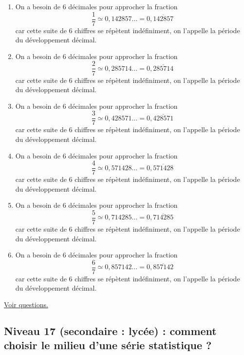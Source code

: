 \documentclass[11pt]{article}
\begin{document}
\begin{enumerate}
\item On a besoin de 6 décimales pour approcher la fraction 
     \[\dfrac{1}{7} \simeq 0,142857\dots = 0,\overline{142857}\]
     car cette suite de 6 chiffres se répètent indéfiniment, on
l'appelle la période du développement décimal.
\item On a besoin de 6 décimales pour approcher la fraction 
     \[\dfrac{2}{7} \simeq 0,285714\dots = 0,\overline{285714}\]
     car cette suite de 6 chiffres se répètent indéfiniment, on
l'appelle la période du développement décimal.
\item On a besoin de 6 décimales pour approcher la fraction 
     \[\dfrac{3}{7} \simeq 0,428571\dots = 0,\overline{428571}\]
     car cette suite de 6 chiffres se répètent indéfiniment, on
l'appelle la période du développement décimal.
\item On a besoin de 6 décimales pour approcher la fraction 
     \[\dfrac{4}{7} \simeq 0,571428\dots = 0,\overline{571428}\]
     car cette suite de 6 chiffres se répètent indéfiniment, on
l'appelle la période du développement décimal.
\item On a besoin de 6 décimales pour approcher la fraction 
     \[\dfrac{5}{7} \simeq 0,714285\dots = 0,\overline{714285}\]
     car cette suite de 6 chiffres se répètent indéfiniment, on
l'appelle la période du développement décimal.
\item On a besoin de 6 décimales pour approcher la fraction 
     \[\dfrac{6}{7} \simeq 0,857142\dots = 0,\overline{857142}\]
     car cette suite de 6 chiffres se répètent indéfiniment, on
l'appelle la période du développement décimal.
\end{enumerate}


\hyperref[orgd4d3fd8]{Voir questions.}


\newpage

\subsection{Niveau 17 (secondaire : lycée) : comment choisir le milieu d'une série statistique ?}
\label{sec:org0a882ed}

\label{org3b54be7}
\end{document}
